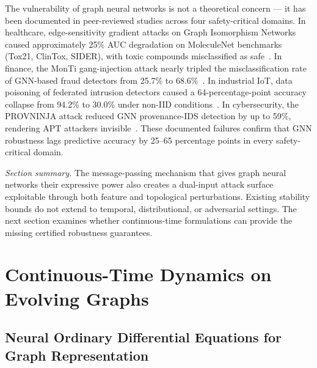 The vulnerability of graph neural networks is not a theoretical concern --- it has been documented in peer-reviewed studies across four safety-critical domains. In healthcare, edge-sensitivity gradient attacks on Graph Isomorphism Networks caused approximately 25\% AUC degradation on MoleculeNet benchmarks (Tox21, ClinTox, SIDER), with toxic compounds misclassified as safe~\cite{EdgeSensitivity2025}. In finance, the MonTi gang-injection attack nearly tripled the misclassification rate of GNN-based fraud detectors from 25.7\% to 68.6\%~\cite{MonTi2025}. In industrial IoT, data poisoning of federated intrusion detectors caused a 64-percentage-point accuracy collapse from 94.2\% to 30.0\% under non-IID conditions~\cite{FerragPoisoning2023}. In cybersecurity, the PROVNINJA attack reduced GNN provenance-IDS detection by up to 59\%, rendering APT attackers invisible~\cite{PROVNINJA2023}. These documented failures confirm that GNN robustness lags predictive accuracy by 25--65 percentage points in every safety-critical domain.

\medskip
\noindent\textit{Section summary.} The message-passing mechanism that gives graph neural networks their expressive power also creates a dual-input attack surface exploitable through both feature and topological perturbations. Existing stability bounds do not extend to temporal, distributional, or adversarial settings. The next section examines whether continuous-time formulations can provide the missing certified robustness guarantees.


\section{Continuous-Time Dynamics on Evolving Graphs}
\label{sec:ct_dynamics}

\subsection{Neural Ordinary Differential Equations for Graph Representation}

